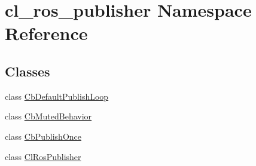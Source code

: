 \hypertarget{namespacecl__ros__publisher}{}\section{cl\+\_\+ros\+\_\+publisher Namespace Reference}
\label{namespacecl__ros__publisher}
\subsection*{Classes}
\begin{DoxyCompactItemize}
\item 
class \hyperlink{classcl__ros__publisher_1_1CbDefaultPublishLoop}{Cb\+Default\+Publish\+Loop}
\item 
class \hyperlink{classcl__ros__publisher_1_1CbMutedBehavior}{Cb\+Muted\+Behavior}
\item 
class \hyperlink{classcl__ros__publisher_1_1CbPublishOnce}{Cb\+Publish\+Once}
\item 
class \hyperlink{classcl__ros__publisher_1_1ClRosPublisher}{Cl\+Ros\+Publisher}
\end{DoxyCompactItemize}
